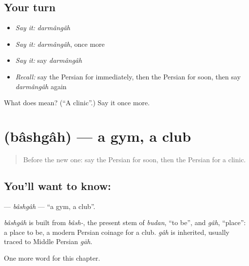 \subsection*{Your turn}
\begin{itemize}
\raggedright
  \item \emph{Say it:} \emph{darmângâh}
  \item \emph{Say it:} \emph{darmângâh}, once more
  \item \emph{Say it:} say \emph{darmângâh}
  \item \emph{Recall:} say the Persian for immediately, then the Persian for soon, then say \emph{darmângâh} again
\end{itemize}

\begin{tcolorbox}[breakable,colback=teal!4,colframe=teal!35!black,title={Before you move on}]
What does  mean? (\textquotedblleft{}A clinic\textquotedblright{}.) Say it once more.
\end{tcolorbox}
\section[\texorpdfstring{\fa{باشگاه} (bâshgâh)}{باشگاه (bâshgâh)}]{ (bâshgâh) — a gym, a club}

\label{lesson:FA-C193-bashgah}



\begin{quote}
Before the new one: say the Persian for soon, then the Persian for a clinic.
\end{quote}

\subsection*{You'll want to know: }
\textbf{} — \emph{bâshgâh} — \textquotedblleft{}a gym, a club\textquotedblright{}.

\begin{cousinweb}
\emph{bâshgâh} is built from \emph{bâsh-}, the present stem of \emph{budan}, \textquotedblleft{}to be\textquotedblright{}, and \emph{gâh}, \textquotedblleft{}place\textquotedblright{}: a place to be, a modern Persian coinage for a club. \emph{gâh} is inherited, usually traced to Middle Persian \emph{gāh}.
\end{cousinweb}

\begin{grammarlens}[title={What you've built}]
One more word for this chapter.
\end{grammarlens}

